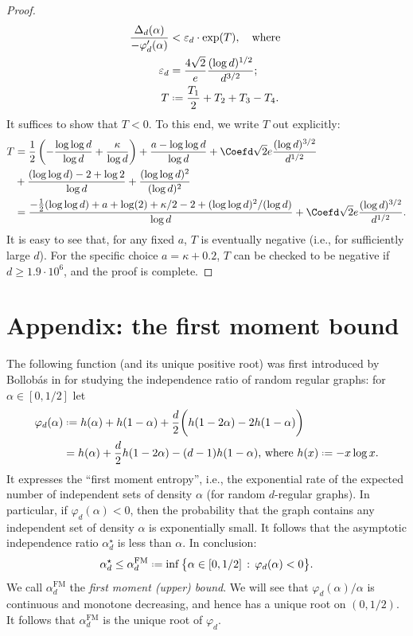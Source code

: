 \documentclass[12pt]{amsart}
\theoremstyle{definition}
\newcommand\al{\alpha}
\newcommand\De{\Delta}
\newcommand\eps{\varepsilon}
\newcommand\ka{\kappa}
\newcommand\alstar{\alpha^{\star}}
\newcommand\alfm{\alpha^{\mathrm{FM}}}
\newcommand{\defeq}{\mathrel{\vcenter{\baselineskip0.5ex \lineskiplimit0pt
                     \hbox{\scriptsize.}\hbox{\scriptsize.}}}%
                     =}
\begin{document}
\begin{proof}
\begin{align*}
\frac{\De_d(\al)}{-\varphi'_d(\al)} &< \eps_d 
\cdot \exp(T) , \quad \text{where } \\
\eps_d &= \frac{4\sqrt{2}}{e} 
\frac{(\log d)^{1/2}}{d^{3/2}} ;\\
T & \defeq \frac{T_1}{2}+T_2+T_3-T_4 .
\end{align*}
%
It suffices to show that $T<0$. To this end, we write $T$ out explicitly:
%
\begin{align*}
T &= \frac12 \left( - \frac{\log\log d}{\log d} + \frac{\ka}{\log d} \right) 
+ \frac{a-\log\log d}{\log d} 
+ \Coefd \sqrt{2} e 
\frac{(\log d)^{3/2}}{d^{1/2}} \\
&+ \frac{(\log\log d)-2+\log 2}{\log d} 
+\frac{(\log\log d)^2}{(\log d)^2} \\
&= \frac{-\frac12 (\log\log d) + a + \log(2) + \ka/2 - 2 
+ (\log\log d)^2/(\log d)}{\log d}
+ \Coefd \sqrt{2} e 
\frac{(\log d)^{3/2}}{d^{1/2}} .
\end{align*}
%
It is easy to see that, for any fixed $a$, $T$ is eventually negative (i.e., for sufficiently large $d$). For the specific choice $a=\ka+0.2$, $T$ can be checked to be negative if $d \geq 1.9\cdot 10^6$, and the proof is complete. 
%
\end{proof}






\newpage
\section{Appendix: the first moment bound} \label{sec:fm_bound}

The following function (and its unique positive root) was first introduced by Bollob\'as in \cite{bollobas1981independence} for studying the independence ratio of random regular graphs: for $\al \in [0,1/2]$ let 
%
%
\begin{align*}
\varphi_d(\al)  
&\defeq h(\al)+h(1-\al) + \frac{d}{2} 
\bigg( h(1-2\al) - 2h(1-\al) \bigg) \\
&= h(\al) + \frac{d}{2} h(1-2\al) - (d-1) h(1-\al) 
\text{, where } h(x) \defeq -x \log x .
\end{align*}
%
It expresses the ``first moment entropy'', i.e., the exponential rate of the expected number of independent sets of density $\al$ (for random $d$-regular graphs). In particular, if $\varphi_d(\al)<0$, then the probability that the graph contains any independent set of density $\al$ is exponentially small. It follows that the asymptotic independence ratio $\alstar_d$ is less than $\al$. In conclusion: 
%
\[ \alstar_d \leq \alfm_d 
\defeq \inf\big\{ \al \in [0,1/2] \, : \, \varphi_d(\al)<0 \big\} .\]
%
We call $\alfm_d$ the \emph{first moment (upper) bound}. We will see that $\varphi_d(\al)/\al$ is continuous and monotone decreasing, and hence has a unique root on $(0,1/2)$. It follows that $\alfm_d$ is the unique root of $\varphi_d$.
\end{document}
